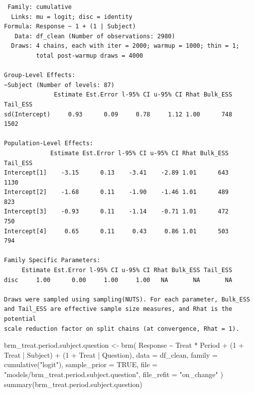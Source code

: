 \documentclass[
  12pt,
  a4paper,
  extrafontsizes,
  onecolumn,
  openright]{memoir}
\newenvironment{Shaded}{\begin{snugshade}}{\end{snugshade}}
\newcommand{\AttributeTok}[1]{\textcolor[rgb]{0.40,0.45,0.13}{#1}}
\newcommand{\ConstantTok}[1]{\textcolor[rgb]{0.56,0.35,0.01}{#1}}
\newcommand{\DecValTok}[1]{\textcolor[rgb]{0.68,0.00,0.00}{#1}}
\newcommand{\FunctionTok}[1]{\textcolor[rgb]{0.28,0.35,0.67}{#1}}
\newcommand{\NormalTok}[1]{\textcolor[rgb]{0.00,0.23,0.31}{#1}}
\newcommand{\OtherTok}[1]{\textcolor[rgb]{0.00,0.23,0.31}{#1}}
\newcommand{\SpecialCharTok}[1]{\textcolor[rgb]{0.37,0.37,0.37}{#1}}
\newcommand{\StringTok}[1]{\textcolor[rgb]{0.13,0.47,0.30}{#1}}
\begin{document}
\begin{verbatim}
 Family: cumulative 
  Links: mu = logit; disc = identity 
Formula: Response ~ 1 + (1 | Subject) 
   Data: df_clean (Number of observations: 2980) 
  Draws: 4 chains, each with iter = 2000; warmup = 1000; thin = 1;
         total post-warmup draws = 4000

Group-Level Effects: 
~Subject (Number of levels: 87) 
              Estimate Est.Error l-95% CI u-95% CI Rhat Bulk_ESS Tail_ESS
sd(Intercept)     0.93      0.09     0.78     1.12 1.00      748     1502

Population-Level Effects: 
             Estimate Est.Error l-95% CI u-95% CI Rhat Bulk_ESS Tail_ESS
Intercept[1]    -3.15      0.13    -3.41    -2.89 1.01      643     1130
Intercept[2]    -1.68      0.11    -1.90    -1.46 1.01      489      823
Intercept[3]    -0.93      0.11    -1.14    -0.71 1.01      472      750
Intercept[4]     0.65      0.11     0.43     0.86 1.01      503      794

Family Specific Parameters: 
     Estimate Est.Error l-95% CI u-95% CI Rhat Bulk_ESS Tail_ESS
disc     1.00      0.00     1.00     1.00   NA       NA       NA

Draws were sampled using sampling(NUTS). For each parameter, Bulk_ESS
and Tail_ESS are effective sample size measures, and Rhat is the potential
scale reduction factor on split chains (at convergence, Rhat = 1).
\end{verbatim}

\begin{Shaded}
\begin{Highlighting}[]
\NormalTok{brm\_treat.period.subject.question }\OtherTok{\textless{}{-}} \FunctionTok{brm}\NormalTok{(}
\NormalTok{    Response }\SpecialCharTok{\textasciitilde{}}\NormalTok{ Treat }\SpecialCharTok{*}\NormalTok{ Period }\SpecialCharTok{+}\NormalTok{ (}\DecValTok{1} \SpecialCharTok{+}\NormalTok{ Treat }\SpecialCharTok{|}\NormalTok{ Subject) }\SpecialCharTok{+}\NormalTok{ (}\DecValTok{1} \SpecialCharTok{+}\NormalTok{ Treat }\SpecialCharTok{|}\NormalTok{ Question),}
    \AttributeTok{data =}\NormalTok{ df\_clean,}
    \AttributeTok{family =} \FunctionTok{cumulative}\NormalTok{(}\StringTok{"logit"}\NormalTok{),}
    \AttributeTok{sample\_prior =} \ConstantTok{TRUE}\NormalTok{,}
    \AttributeTok{file =} \StringTok{"models/brm\_treat.period.subject.question"}\NormalTok{,}
    \AttributeTok{file\_refit =} \StringTok{"on\_change"}
\NormalTok{)}
\FunctionTok{summary}\NormalTok{(brm\_treat.period.subject.question)}
\end{Highlighting}
\end{Shaded}
\end{document}
